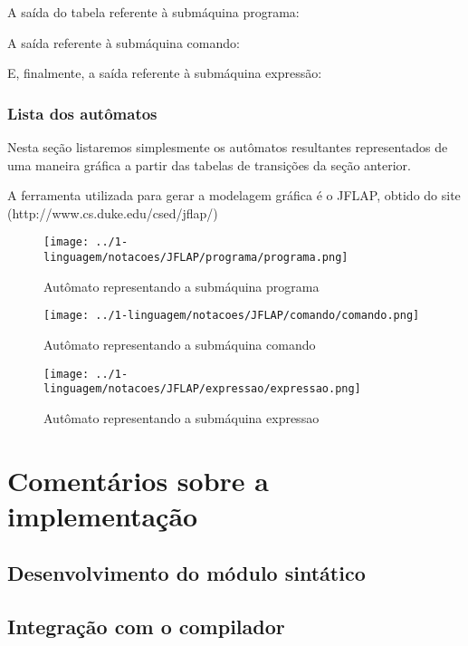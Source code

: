 \documentclass[12pt,oneside,a4paper,english]{abntex2}
\begin{document}
      A saída do tabela referente à submáquina programa:

      


      A saída referente à submáquina comando:

      

      
      E, finalmente, a saída referente à submáquina expressão:

      

    \subsection{Lista dos autômatos}

      Nesta seção listaremos simplesmente os autômatos resultantes representados de uma maneira gráfica a partir das tabelas de transições da seção anterior.


      A ferramenta utilizada para gerar a modelagem gráfica é o JFLAP, obtido do site (http://www.cs.duke.edu/csed/jflap/)


      \begin{figure}[H]
        \caption{Autômato representando a submáquina programa}
        \centering
          \texttt{[image: ../1-linguagem/notacoes/JFLAP/programa/programa.png]}
      \end{figure}

      \begin{figure}[H]
        \caption{Autômato representando a submáquina comando}
        \centering
          \texttt{[image: ../1-linguagem/notacoes/JFLAP/comando/comando.png]}
      \end{figure}


      \begin{figure}[H]
        \caption{Autômato representando a submáquina expressao}
        \centering
          \texttt{[image: ../1-linguagem/notacoes/JFLAP/expressao/expressao.png]}
      \end{figure}

\chapter{Comentários sobre a implementação}

  \section{Desenvolvimento do módulo sintático}

  \section{Integração com o compilador}
\end{document}
